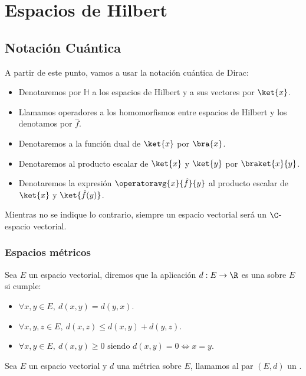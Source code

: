 \chapter{Espacios de Hilbert}

\section{Notación Cuántica}
A partir de este punto, vamos a usar la notación cuántica de Dirac:
\begin{itemize}
  \item Denotaremos por $\mathbb{H}$ a los espacios de Hilbert y a sus vectores por $\ket{x}$.
  \item Llamamos operadores a los homomorfismos entre espacios de Hilbert y los denotamos por $\hat{f}$.
  \item Denotaremos a la función dual de $\ket{x}$ por $\bra{x}$.
  \item Denotaremos al producto escalar de $\ket{x}$ y $\ket{y}$ por $\braket{x}{y}$.
  \item Denotaremos la expresión $\operatoravg{x}{\hat{f}}{y}$ al producto escalar de ${\ket{x}}$ y $\ket{\hat{f}(y)}$.
\end{itemize}

Mientras no se indique lo contrario, siempre un espacio vectorial será un $\C$-espacio vectorial.

\subsection{Espacios métricos}
\begin{definition}
  \label{distancia}
  Sea $E$ un espacio vectorial, diremos que la aplicación $d:E \rightarrow \R$ es una  sobre $E$ si cumple:
  \begin{itemize}
    \item $\forall x,y \in E,\ d(x,y)=d(y,x)$.
    \item $\forall x,y,z \in E,\ d(x,z)\leq d(x, y)+d(y, z)$.
    \item $\forall x, y \in E,\ d(x,y)\geq 0 \text{ siendo } d(x,y)=0\Leftrightarrow x = y$.
  \end{itemize}
\end{definition}

\begin{definition}
  \label{espacio_metrico}
  Sea $E$ un espacio vectorial y $d$ una métrica sobre $E$, llamamos al par $(E, d)$ un .
\end{definition}

